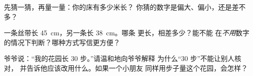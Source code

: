 \begin{exercise}[$\star$]\label{exo:g2:measuring-length:8}
先猜一猜，再量一量：你的床有多少米长？
你猜的数字是偏大、偏小，还是差不多？
\end{exercise}

\begin{exercise}[$\star\star$]\label{exo:g2:measuring-length:9}
一条丝带长 \qty{45}{cm}，另一条长 \qty{38}{cm}。哪条
更长，相差多少？能不能
在\emph{不用}数字的情况下判断？哪种方式写信更方便？
\end{exercise}

\begin{exercise}[$\star\star$]\label{exo:g2:measuring-length:10}
爷爷说：“我的花园长 $30$ 步。”请温和地向爷爷解释
为什么“$30$ 步”不能让别人核对，
并告诉他应该改用什么。如果一个小朋友
同样用步子量这个花园，会怎样？
\end{exercise}
